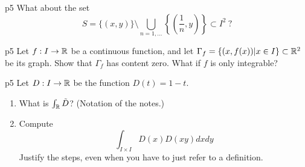 \documentclass[a4paper, 11pt]{article}
\begin{document}

\begin{problem}{%
}{p5%
}
What about the set 
\[
S=\{(x,y)\}\setminus \underset{n=1,\dots}\bigcup \left\{\left(\frac{1}{n},y\right)\right\}\subset I^2 \ ?
\]
\end{problem}

\solve{
}



\begin{problem}{%
	}{p5%
	}
	Let $f:I \to \mathbb{R}$ be a continuous function, and let $\Gamma_f=\{(x,f(x))|x \in I\} \subset \mathbb{R}^2$ be its graph. Show that $\Gamma_f$ has content zero. What if $f$ is only integrable?
\end{problem}

\solve{
}



\begin{problem}{%
	}{p5%
	}
	Let $D:I \to \mathbb{R}$ be the function $D(t)=1-t$. 
	\begin{enumerate} 
		\item What is $\int_{\mathbb{R}} \tilde{D}$? (Notation of the notes.)
		\item Compute
		\[
		\int_{I \times I} D(x)D(xy) dxdy
		\]
		Justify the steps, even when you have to just refer to a definition.
	\end{enumerate} 
\end{problem}

\solve{
}
\end{document}
